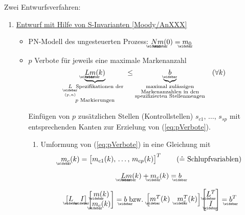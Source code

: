 Zwei Entwurfsverfahren:
\begin{enumerate}
	\item \underline{Entwurf mit Hilfe von S-Invarianten [Moody/AnXXX]}
		
		\begin{itemize}
			\item PN-Modell des ungesteuerten Prozess: $\wbar{N} \wbar{m}(0) = \wbar{m}_0$
			\item $p$ Verbote für jeweils eine maximale Markenanzahl
			\begin{equation}
				\label{eq:pVerbote}
				\underbrace{\wbar{L} \wbar{m}(k)}_{
				\begin{subarray}{c}
					\underset{(p,n)}{\wbar{L}}  \text{Spezifikationen der~} \\ p \text{~Markierungen}
				\end{subarray}} \le \underbrace{\wbar{b}}_{
				\begin{subarray}{c}
					\text{maximal zulässigen} \\
					\text{Markenanzahlen in den} \\
					\text{spezifizierten Stellenmengen}
				\end{subarray}	
				} \quad( \forall k) 
			\end{equation}
			
			Einfügen von $p$ zusätzlichen Stellen (Kontrollstellen) $s_{c1},\,\ldots,\,s_{sp}$ mit entsprechenden Kanten zur Erzielung von (\ref{eq:pVerbote}).
			
			\begin{enumerate}[label=(\roman*)]
				\item Umformung von (\ref{eq:pVerbote}) in eine Gleichung mit 
				\begin{equation}
				\wbar{m}_c(k) = \m{m_{c1}(k),\,\ldots,\,m_{cp}(k)}^T \qquad \text{($\hat{=}$ Schlupfvariablen)}
				\end{equation}
				
				\begin{equation}
					\label{eq:vorgehen1}
					\wbar{L} \wbar{m}(k) + \wbar{m}_c(k) = \wbar{b}
				\end{equation}
				
				\begin{equation}
					\label{eq:vorgehen2}
					\m{\wbar{L} & \wbar{I}} \m{\wbar{m}(k) \\ \wbar{m}_c(k)} = \wbar{b} 
					\; \text{bzw.} \;
					\m{\wbar{m}^T(k) & \wbar{m}_c^T(k)} \m{\wbar{L}^T \\ \wbar{I}} = \wbar{b}^T
				\end{equation}
				

\end{enumerate}
\end{itemize}
\end{enumerate}
